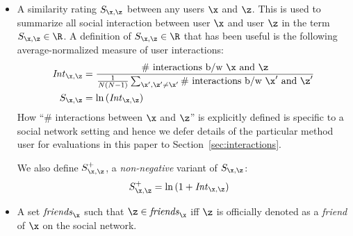 \begin{itemize}
\item A similarity rating $S_{\x,\z}$ between any users $\x$ and $\z$. This is used to summarize all social
interaction between user $\x$ and user $\z$ in the term $S_{\x,\z} \in
\R$.  A definition of $S_{\x,\z} \in \R$ that has been useful is the
following average-normalized measure of user interactions:
\begin{align}
\mathit{Int}_{\x,\z} & = \frac{\mbox{\# interactions b/w $\x$
and $\z$}}{\frac{1}{N(N-1)} \sum_{\x',\z'\neq \x'} \mbox{\# interactions b/w $\x'$
and $\z'$}} \nonumber \\
S_{\x,\z} & = \ln \left( \mathit{Int}_{\x,\z} \right)
\end{align}
How ``\# interactions between $\x$ and $\z$'' is explicitly defined is
specific to a social network setting and hence we defer details of the
particular method user for evaluations in this paper to
Section~\ref{sec:interactions}.

We also define $S^+_{\x,\z}$, a \emph{non-negative} 
variant of $S_{\x,\z}$:
\begin{align}
S^+_{\x,\z} & = \ln \left( 1 + \mathit{Int}_{\x,\z} \right)
\end{align}
\item A set $\mathit{friends}_\x$ such that $\z \in \mathit{friends}_\x$
iff $\z$ is officially denoted as a \emph{friend} of $\x$ 
on the social network.
\end{itemize}

%

